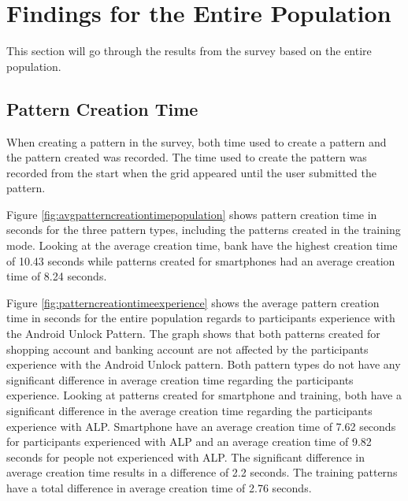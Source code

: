 \section{Findings for the Entire Population}
  
  This section will go through the results from the survey based on the entire population. 

  


	\subsection{Pattern Creation Time}
    When creating a pattern in the survey, both time used to create a pattern and the pattern created was recorded. The time used to create the pattern was recorded from the start when the grid appeared until the user submitted the pattern.

    Figure \ref{fig:avgpatterncreationtimepopulation} shows pattern creation time in seconds for the three pattern types, including the patterns created in the training mode. Looking at the average creation time, bank have the highest creation time of 10.43 seconds while patterns created for smartphones had an average creation time of 8.24 seconds. 

    Figure \ref{fig:patterncreationtimeexperience} shows the average pattern creation time in seconds for the entire population regards to participants experience with the Android Unlock Pattern. The graph shows that both patterns created for shopping account and banking account are not affected by the participants experience with the Android Unlock pattern. Both pattern types do not have any significant difference in average creation time regarding the participants experience. Looking at patterns created for smartphone and training, both have a significant difference in the average creation time regarding the participants experience with ALP. Smartphone have an average creation time of 7.62 seconds for participants experienced with ALP and an average creation time of 9.82 seconds for people not experienced with ALP. The significant difference in average creation time results in a difference of 2.2 seconds. The training patterns have a total difference in average creation time of 2.76 seconds.  

